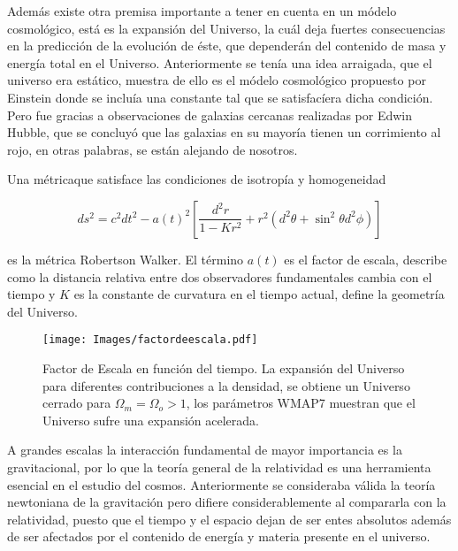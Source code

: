 \documentclass[a4,useAMS,usenatbib,usegraphicx,12pt]{article}
\begin{document}
Además existe otra premisa importante a tener en cuenta en un módelo 
cosmológico, está es la expansión del Universo, la cuál deja fuertes 
consecuencias en la predicción de la evolución de éste, 
que dependerán del contenido de masa y energía total en el Universo. 
Anteriormente se tenía una idea arraigada, que el universo era estático, muestra de 
ello es el módelo cosmológico propuesto por Einstein donde se incluía 
una constante tal que se satisfacíera dicha condición.
Pero fue gracias a observaciones de galaxias cercanas realizadas 
por Edwin Hubble, que se concluyó que las galaxias en su mayoría 
tienen un corrimiento al rojo, en otras palabras, se están alejando 
de nosotros. 
\

Una métricaque satisface las condiciones de isotropía y homogeneidad 

\begin{equation}
ds^2= c^2dt^2-a(t)^2\left[\frac{d^2r}{1-Kr^2} +r^2(d^2\theta
 + \sin^2\theta d^2\phi )\right]
\label{metrica}
\end{equation} 	

es la métrica Robertson Walker. El término $a(t)$ 
es el factor de escala, describe como la distancia relativa entre 
dos observadores fundamentales cambia con el tiempo y $K$ es la 
constante de curvatura en el tiempo actual, define la geometría
del Universo. 
 
\begin{figure}[htbp]
       \centering
               \texttt{[image: Images/factordeescala.pdf]}
       \caption{ \small Factor de Escala en función del tiempo. La expansión del Universo para 
       diferentes contribuciones a la densidad, se obtiene un Universo cerrado para $\Omega_m = \Omega_o>1$,
       los parámetros WMAP7 muestran que el Universo sufre una expansión acelerada. 
       }
       \label{factor}
 \end{figure}


A grandes escalas la interacción fundamental de mayor importancia es 
la gravitacional, por lo que la teoría general de la relatividad 
es una herramienta esencial en el estudio del cosmos. 
Anteriormente se consideraba válida la teoría newtoniana de la gravitación pero 
difiere considerablemente al compararla con la relatividad, 
puesto que el tiempo y el espacio dejan de ser entes absolutos 
además de ser afectados por 
el contenido de energ\'ia y materia presente en el universo. 
\end{document}
